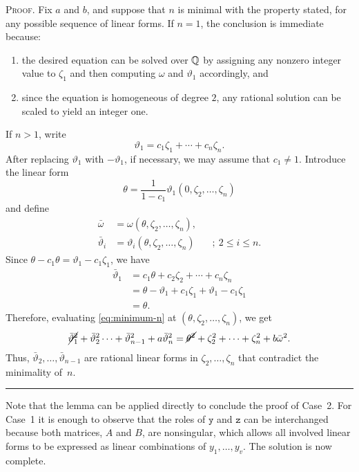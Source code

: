 \begin{solution}
    \small
    \textsc{Proof.} Fix\/ $a$ and\/ $b$, and suppose that\/ $n$ is minimal with the property stated, for any possible sequence of linear forms. If\/ $n=1$, the conclusion is immediate because:
    \begin{enumerate}[-]
        \item the desired equation can be solved over $\mathbb{Q}$ by assigning any nonzero integer value to\/ $\zeta_1$ and then computing\/ $\omega$ and\/ $\vartheta_1$ accordingly, and  
        \item since the equation is homogeneous of degree\/ $2$, any rational solution can be scaled to yield an integer one.
    \end{enumerate}


    If $n>1$, write
    $$
        \vartheta_1 = c_1\zeta_1+\cdots+c_n\zeta_n.
    $$
    After replacing $\vartheta_1$ with $-\vartheta_1$, if necessary, we may assume that $c_1\ne1$. Introduce the linear form
    $$
        \theta=\frac1{1-c_1}\vartheta_1(0,\zeta_2,\dots,\zeta_n)
    $$
    and define
    \begin{align*}
        \bar\omega &= \omega(\theta,\zeta_2,\dots,\zeta_n),\\
        \bar\vartheta_i &= \vartheta_i(\theta,\zeta_2,\dots,\zeta_n)
            &&;\ 2\le i\le n.
    \end{align*}
    Since $\theta-c_1\theta=\vartheta_1-c_1\zeta_1$, we have
    \begin{align*}
        \bar\vartheta_1
            &= c_1\theta+c_2\zeta_2+\cdots+c_n\zeta_n\\
            &= \theta - \vartheta_1 + c_1\zeta_1
                + \vartheta_1 - c_1\zeta_1\\
            &= \theta.
    \end{align*}
    Therefore, evaluating \eqref{eq:minimum-n} at $(\theta,\zeta_2,\dots,\zeta_n)$, we get
    $$
        \cancel{\bar\vartheta_1^2}+\bar\vartheta_2^2\cdots+\bar\vartheta_{n-1}^2+a\bar\vartheta_n^2
            = \cancel{\theta^2}+\zeta_2^2+\cdots+\zeta_n^2
                +b\bar\omega^2.
    $$
    Thus, $\bar\vartheta_2,\dots,\bar\vartheta_{n-1}$ are rational linear forms in $\zeta_2,\dots,\zeta_n$ that contradict the minimality of~$n$.\hfill\rule{0.6em}{0.6em}
    
    \normalsize
    Note that the lemma can be applied directly to conclude the proof of Case~2. For Case~1 it is enough to observe that the roles of $\mathtt y$ and $\mathtt z$ can be interchanged because both matrices, $A$ and $B$, are nonsingular, which allows all involved linear forms to be expressed as linear combinations of $y_1,\dots,y_v$. The solution is now complete.


\end{solution}
